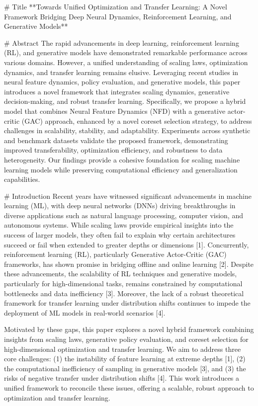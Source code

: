 # Title  
**Towards Unified Optimization and Transfer Learning: A Novel Framework Bridging Deep Neural Dynamics, Reinforcement Learning, and Generative Models**

# Abstract  
The rapid advancements in deep learning, reinforcement learning (RL), and generative models have demonstrated remarkable performance across various domains. However, a unified understanding of scaling laws, optimization dynamics, and transfer learning remains elusive. Leveraging recent studies in neural feature dynamics, policy evaluation, and generative models, this paper introduces a novel framework that integrates scaling dynamics, generative decision-making, and robust transfer learning. Specifically, we propose a hybrid model that combines Neural Feature Dynamics (NFD) with a generative actor-critic (GAC) approach, enhanced by a novel coreset selection strategy, to address challenges in scalability, stability, and adaptability. Experiments across synthetic and benchmark datasets validate the proposed framework, demonstrating improved transferability, optimization efficiency, and robustness to data heterogeneity. Our findings provide a cohesive foundation for scaling machine learning models while preserving computational efficiency and generalization capabilities.

# Introduction  
Recent years have witnessed significant advancements in machine learning (ML), with deep neural networks (DNNs) driving breakthroughs in diverse applications such as natural language processing, computer vision, and autonomous systems. While scaling laws provide empirical insights into the success of larger models, they often fail to explain why certain architectures succeed or fail when extended to greater depths or dimensions [1]. Concurrently, reinforcement learning (RL), particularly Generative Actor-Critic (GAC) frameworks, has shown promise in bridging offline and online learning [2]. Despite these advancements, the scalability of RL techniques and generative models, particularly for high-dimensional tasks, remains constrained by computational bottlenecks and data inefficiency [3]. Moreover, the lack of a robust theoretical framework for transfer learning under distribution shifts continues to impede the deployment of ML models in real-world scenarios [4].  

Motivated by these gaps, this paper explores a novel hybrid framework combining insights from scaling laws, generative policy evaluation, and coreset selection for high-dimensional optimization and transfer learning. We aim to address three core challenges: (1) the instability of feature learning at extreme depths [1], (2) the computational inefficiency of sampling in generative models [3], and (3) the risks of negative transfer under distribution shifts [4]. This work introduces a unified framework to reconcile these issues, offering a scalable, robust approach to optimization and transfer learning.

